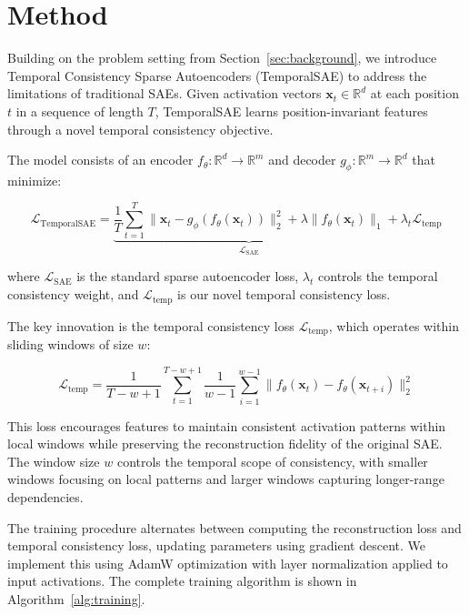 \documentclass{article} %
\begin{document}
\section{Method}
\label{sec:method}

Building on the problem setting from Section~\ref{sec:background}, we introduce Temporal Consistency Sparse Autoencoders (TemporalSAE) to address the limitations of traditional SAEs. Given activation vectors $\mathbf{x}_t \in \mathbb{R}^d$ at each position $t$ in a sequence of length $T$, TemporalSAE learns position-invariant features through a novel temporal consistency objective.

The model consists of an encoder $f_\theta: \mathbb{R}^d \rightarrow \mathbb{R}^m$ and decoder $g_\phi: \mathbb{R}^m \rightarrow \mathbb{R}^d$ that minimize:

\begin{equation}
    \mathcal{L}_{\text{TemporalSAE}} = \underbrace{\frac{1}{T}\sum_{t=1}^T \|\mathbf{x}_t - g_\phi(f_\theta(\mathbf{x}_t))\|_2^2 + \lambda \|f_\theta(\mathbf{x}_t)\|_1}_{\mathcal{L}_{\text{SAE}}} + \lambda_t \mathcal{L}_{\text{temp}}
\end{equation}

where $\mathcal{L}_{\text{SAE}}$ is the standard sparse autoencoder loss, $\lambda_t$ controls the temporal consistency weight, and $\mathcal{L}_{\text{temp}}$ is our novel temporal consistency loss.

The key innovation is the temporal consistency loss $\mathcal{L}_{\text{temp}}$, which operates within sliding windows of size $w$:

\begin{equation}
    \mathcal{L}_{\text{temp}} = \frac{1}{T-w+1}\sum_{t=1}^{T-w+1} \frac{1}{w-1}\sum_{i=1}^{w-1} \|f_\theta(\mathbf{x}_t) - f_\theta(\mathbf{x}_{t+i})\|_2^2
\end{equation}

This loss encourages features to maintain consistent activation patterns within local windows while preserving the reconstruction fidelity of the original SAE. The window size $w$ controls the temporal scope of consistency, with smaller windows focusing on local patterns and larger windows capturing longer-range dependencies.

The training procedure alternates between computing the reconstruction loss and temporal consistency loss, updating parameters using gradient descent. We implement this using AdamW optimization \cite{loshchilov2017adamw} with layer normalization \cite{ba2016layer} applied to input activations. The complete training algorithm is shown in Algorithm~\ref{alg:training}.
\end{document}
